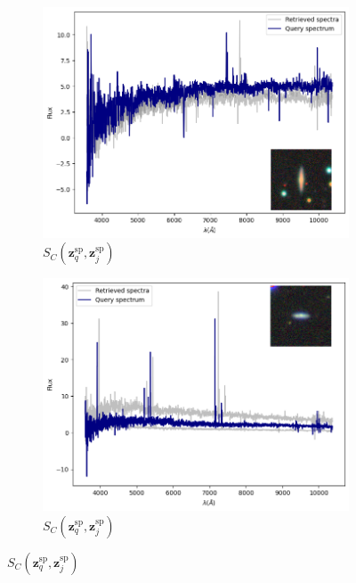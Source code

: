 \documentclass[a4paper,12pt]{article}
\begin{document}
\begin{figure}[H]
    \begin{subfigure}[b]{0.45\textwidth}
        \centering
        \includegraphics[width=\textwidth]{../figures/spectral_retrieval_sp_sp_1}
        \caption{$S_C(\mathbf{z}_q^{\text{sp}}, \mathbf{z}_j^{\text{sp}})$}
        \label{fig:sp_sp_1}
    \end{subfigure}%
    \hfill
    \begin{subfigure}[b]{0.45\textwidth}
        \centering
        \includegraphics[width=\textwidth]{../figures/spectral_retrieval_sp_sp_2}
        \caption{$S_C(\mathbf{z}_q^{\text{sp}}, \mathbf{z}_j^{\text{sp}})$}
        \label{fig:sp_sp_2}
    \end{subfigure}


\end{figure}
\end{document}
